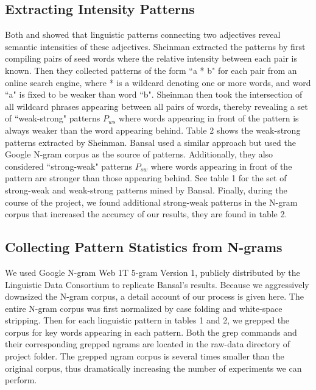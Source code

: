 \subsection{Extracting Intensity Patterns}

Both  and  showed that linguistic patterns connecting two adjectives reveal semantic intensities of these adjectives. Sheinman extracted the patterns by first compiling pairs of seed words where the relative intensity between each pair is known.
Then they collected patterns of the form ``a * b" for each pair from an online search engine, where * is a wildcard denoting one or more words, and word ``a" is fixed to be weaker than word ``b". Sheinman then took the intersection of all wildcard phrases appearing between all pairs of words, thereby revealing a set of ``weak-strong" patterns $P_{ws}$ where words appearing in front of the pattern is always weaker than the word appearing behind. Table 2 shows the weak-strong patterns extracted by Sheinman. Bansal used a similar approach but used the Google N-gram corpus \cite{brants2006web} as the source of patterns. Additionally, they also considered ``strong-weak" patterns $P_{sw}$ where words appearing in front of the pattern are stronger than those appearing behind. See table 1 for the set of strong-weak and weak-strong patterns mined by Bansal. Finally, during the course of the project, we found additional strong-weak patterns in the N-gram corpus that increased the accuracy of our results, they are found in table 2.

\subsection{Collecting Pattern Statistics from N-grams}

We used Google N-gram Web 1T 5-gram Version 1, publicly distributed by the Linguistic Data Consortium to replicate Bansal's results. Because we aggressively downsized the N-gram corpus, a detail account of our process is given here. The entire N-gram corpus was first normalized by case folding and white-space stripping. Then for each linguistic pattern in tables 1 and 2, we grepped the corpus for key words appearing in each pattern. Both the grep commands and their corresponding grepped ngrams are located in the raw-data directory of project folder. The grepped ngram corpus is several times smaller than the original corpus, thus dramatically increasing the number of experiments we can perform.

